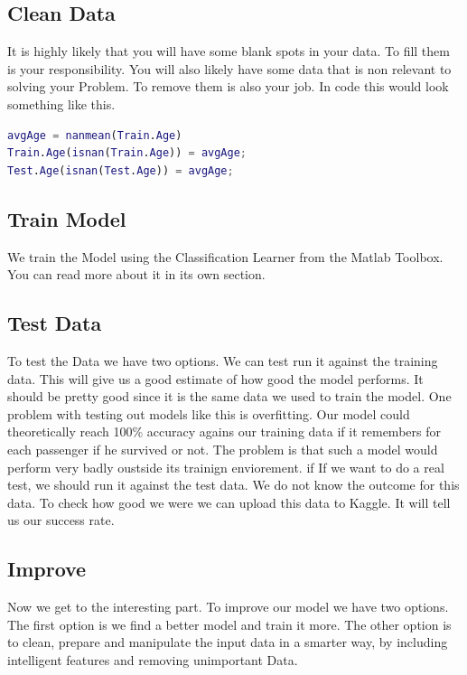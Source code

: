 \documentclass[
   10.5pt,
   invert-title=true,
   titlepage=false,
   titleimage-ratio=13,
   class=article
]{bfhpub}				%
\begin{document}
\subsection*{Clean Data}
It is highly likely that you will have some blank spots in your data. To fill them is your responsibility. You will also likely have some data that is non relevant to solving your Problem. To remove them is also your job. In code this would look something like this.

\begin{lstlisting}[language=Matlab]
avgAge = nanmean(Train.Age)          
Train.Age(isnan(Train.Age)) = avgAge;  
Test.Age(isnan(Test.Age)) = avgAge;    
\end{lstlisting}

\subsection*{Train Model}
We train the Model using the Classification Learner from the Matlab Toolbox. You can read more about it in its own section. 
 
\subsection*{Test Data}
To test the Data we have two options. We can test run it against the training data. This will give us a good estimate of how good the model performs. It should be pretty good since it is the same data we used to train the model. One problem with testing out models like this is overfitting. Our model could theoretically reach 100\% accuracy agains our training data if it remembers for each passenger if he survived or not. The problem is that such a model would perform very badly oustside its trainign enviorement. if If we want to do a real test, we should run it against the test data. We do not know the outcome for this data. To check how good we were we can upload this data to Kaggle. It will tell us our success rate. 

\subsection*{Improve}
Now we get to the interesting part. To improve our model we have two options. The first option is we find a better model and train it more. The other option is to clean, prepare and manipulate the input data in a smarter way, by including intelligent features and removing unimportant Data.
\end{document}
